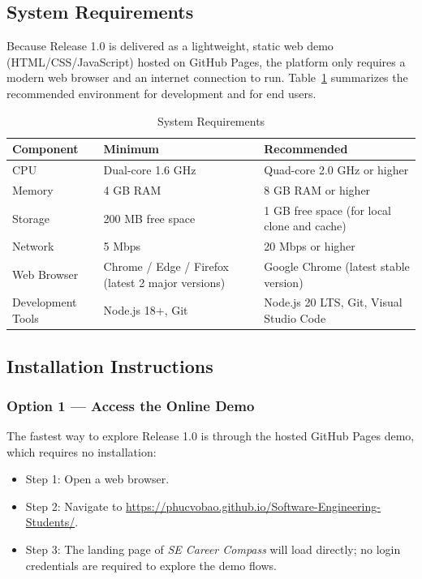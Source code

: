 \subsection{System Requirements}

Because Release 1.0 is delivered as a lightweight, static web demo (HTML/CSS/JavaScript) hosted on GitHub Pages, the platform only requires a modern web browser and an internet connection to run. Table~\ref{tab:sysreq} summarizes the recommended environment for development and for end users.

\begin{table}[H]
\centering
\caption{System Requirements}
\label{tab:sysreq}
\renewcommand{\arraystretch}{1.4}
\begin{tabularx}{\textwidth}{|l|X|X|}
\hline
\rowcolor{tableheader}
\textbf{Component} & \textbf{Minimum} & \textbf{Recommended} \\
\hline
CPU & Dual-core 1.6 GHz & Quad-core 2.0 GHz or higher \\
\hline
Memory & 4 GB RAM & 8 GB RAM or higher \\
\hline
Storage & 200 MB free space & 1 GB free space (for local clone and cache) \\
\hline
Network & 5 Mbps & 20 Mbps or higher \\
\hline
Web Browser & Chrome / Edge / Firefox (latest 2 major versions) & Google Chrome (latest stable version) \\
\hline
Development Tools & Node.js 18+, Git & Node.js 20 LTS, Git, Visual Studio Code \\
\hline
\end{tabularx}
\end{table}

\subsection{Installation Instructions}

\subsubsection{Option 1 — Access the Online Demo}

The fastest way to explore Release 1.0 is through the hosted GitHub Pages demo, which requires no installation:

\begin{itemize}[nosep]
    \item Step 1: Open a web browser.
    \item Step 2: Navigate to \url{https://phucvobao.github.io/Software-Engineering-Students/}.
    \item Step 3: The landing page of \textit{SE Career Compass} will load directly; no login credentials are required to explore the demo flows.
\end{itemize}

